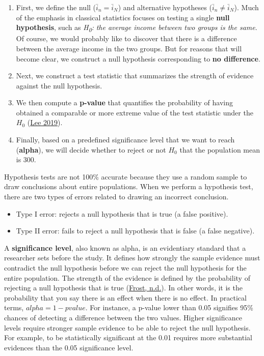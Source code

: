 \documentclass[
]{article}
\providecommand{\tightlist}{%
  \setlength{\itemsep}{0pt}\setlength{\parskip}{0pt}}
\begin{document}
\begin{enumerate}
\def\labelenumi{\arabic{enumi}.}
\tightlist
\item
  First, we define the null (\(\bar i_n = \bar i_N\)) and alternative
  hypotheses (\(\bar i_n \neq \bar i_N\)). Much of the emphasis in
  classical statistics focuses on testing a single \textbf{null
  hypothesis}, such as \emph{H\textsubscript{0}:} \emph{the average income between two groups
  is the same}. Of course, we would probably like to discover that
  there is a difference between the average income in the two groups.
  But for reasons that will become clear, we construct a null
  hypothesis corresponding to \textbf{no difference}.
\item
  Next, we construct a test statistic that summarizes the strength of
  evidence against the null hypothesis.
\item
  We then compute a \textbf{p-value} that quantifies the probability of
  having obtained a comparable or more extreme value of the test
  statistic under the \(H_0\) (\protect\hyperlink{ref-lee2019}{Lee 2019}).
\item
  Finally, based on a predefined significance level that we want to
  reach (\textbf{alpha}), we will decide whether to reject or not \(H_0\)
  that the population mean is 300.
\end{enumerate}

Hypothesis tests are not 100\% accurate because they use a random sample
to draw conclusions about entire populations. When we perform a
hypothesis test, there are two types of errors related to drawing an
incorrect conclusion.

\begin{itemize}
\item
  Type I error: rejects a null hypothesis that is true (a false
  positive).
\item
  Type II error: fails to reject a null hypothesis that is false (a
  false negative).
\end{itemize}

A \textbf{significance level}, also known as alpha, is an evidentiary
standard that a researcher sets before the study. It defines how
strongly the sample evidence must contradict the null hypothesis before
we can reject the null hypothesis for the entire population. The
strength of the evidence is defined by the probability of rejecting a
null hypothesis that is true (\protect\hyperlink{ref-frost}{Frost, n.d.}). In other words, it is the
probability that you say there is an effect when there is no effect. In
practical terms, \(alpha=1-pvalue\). For instance, a p-value lower than
0.05 signifies 95\% chances of detecting a difference between the two
values. Higher significance levels require stronger sample evidence to
be able to reject the null hypothesis. For example, to be statistically
significant at the 0.01 requires more substantial evidences than the
0.05 significance level.
\end{document}
